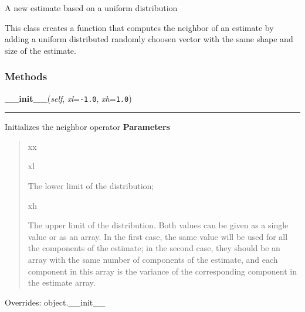 A new estimate based on a uniform distribution

This class creates a function that computes the neighbor of an estimate by
adding a uniform distributed randomly choosen vector with the same shape
and size of the estimate.


  \subsubsection{Methods}

    \vspace{0.5ex}

\hspace{.8\funcindent}\begin{boxedminipage}{\funcwidth}

    \raggedright \textbf{\_\_init\_\_}(\textit{self}, \textit{xl}={\tt -1.0}, \textit{xh}={\tt 1.0})

    \vspace{-1.5ex}

    \rule{\textwidth}{0.5\fboxrule}
\setlength{\parskip}{2ex}

Initializes the neighbor operator
\setlength{\parskip}{1ex}
      \textbf{Parameters}
      \vspace{-1ex}

      \begin{quote}
        \begin{Ventry}{xx}

          \item[xl]


The lower limit of the distribution;
          \item[xh]


The upper limit of the distribution. Both values can be given as a
single value or as an array. In the first case, the same value will
be used for all the components of the estimate; in the second case,
they should be an array with the same number of components of the
estimate, and each component in this array is the variance of the
corresponding component in the estimate array.
        \end{Ventry}

      \end{quote}

      Overrides: object.\_\_init\_\_

    \end{boxedminipage}

